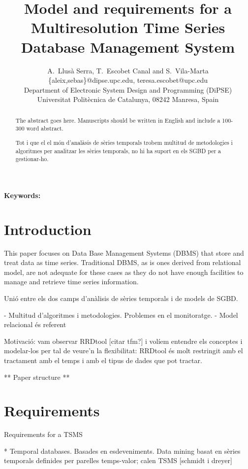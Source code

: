 \documentclass{scrartcl}
\title{
  Model and requirements for a Multiresolution Time Series
  Database Management System }
\author
{
  {
    A.\ Llusà Serra,
    T.\ Escobet Canal
    and S.\ Vila-Marta
  }\\
  {\{aleix,sebas\}@dipse.upc.edu, teresa.escobet@upc.edu}\\
  {Department of Electronic System Design and Programming (DiPSE)}\\
  {Universitat Politècnica de Catalunya, 08242 Manresa, Spain}
}
\begin{document}
\maketitle


\begin{abstract}
The abstract goes here.
Manuscripts should be written in English and include a 100-300 word abstract.

Tot i que el el món d'analàsis de sèries temporals trobem multitud de metodologies i algoritmes per analitzar les sèries temporals, no hi ha suport en els SGBD per a gestionar-ho.
\end{abstract}

{\bfseries Keywords:} 







\section{Introduction}

This paper focuses on Data Base Management Systems (DBMS) that store
and treat data as time series. Traditional DBMS, as is ones derived
from relational model, are not adequate for these cases as they do not
have enough facilities to manage and retrieve time series
information.



Unió entre els dos camps d'anàlisis de sèries temporals i de models de SGBD. 

- Multitud d'algoritmes i metodologies. Problemes en el monitoratge.
- Model relacional és referent




Motivació: vam observar RRDtool [citar tfm?] i volíem entendre els conceptes i modelar-los per tal de veure'n la flexibilitat: RRDtool és molt restringit amb el tractament amb el temps i amb el tipus de dades que pot tractar.



** Paper structure **



\section{Requirements}

Requirements for a TSMS


* Temporal databases. Basades en esdeveniments. Data mining basat en sèries temporals definides per parelles temps-valor; calen TSMS [schmidt i dreyer] 
\end{document}
